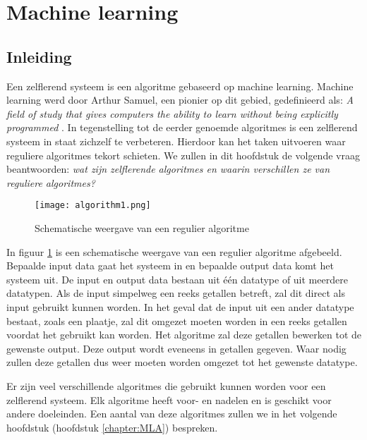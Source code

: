 \section{Machine learning}

\subsection{Inleiding}
Een zelflerend systeem is een algoritme gebaseerd op machine learning. Machine learning werd door Arthur Samuel, een pionier op dit gebied, gedefinieerd als: 
\textit{A field of study that gives computers the ability to learn without being explicitly programmed} \cite{ArthurSamuel}.
In tegenstelling tot de eerder genoemde algoritmes is een zelflerend systeem in staat zichzelf te verbeteren. Hierdoor kan het taken uitvoeren waar reguliere algoritmes tekort schieten. We zullen in dit hoofdstuk de volgende vraag beantwoorden: \textit{wat zijn zelflerende algoritmes en waarin verschillen ze van reguliere algoritmes?}

\begin{figure}[H]
  \centering
    \texttt{[image: algorithm1.png]}
  \caption{Schematische weergave van een regulier algoritme}
  \label{fig:algorithm1}
\end{figure}

In figuur \ref{fig:algorithm1} is een schematische weergave van een regulier algoritme afgebeeld. Bepaalde input data gaat het systeem in en bepaalde output data komt het systeem uit. De input en output data bestaan uit \'e\'en datatype of uit meerdere datatypen. Als de input simpelweg een reeks getallen betreft, zal dit direct als input gebruikt kunnen worden. In het geval dat de input uit een ander datatype bestaat, zoals een plaatje, zal dit omgezet moeten worden in een reeks getallen voordat het gebruikt kan worden. Het algoritme zal deze getallen bewerken tot de gewenste output. Deze output wordt eveneens in getallen gegeven. Waar nodig zullen deze getallen dus weer moeten worden omgezet tot het gewenste datatype.

Er zijn veel verschillende algoritmes die gebruikt kunnen worden voor een zelflerend systeem. Elk algoritme heeft voor- en nadelen en is geschikt voor andere doeleinden. Een aantal van deze algoritmes zullen we in het volgende hoofdstuk (hoofdstuk \ref{chapter:MLA}) bespreken.

